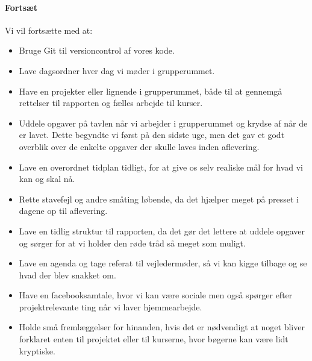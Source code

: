 \documentclass[oneside,a4paper,titlepage]{article}
\begin{document}
\paragraph{Fortsæt}
Vi vil fortsætte med at:
\begin{itemize}
  \item Bruge Git til versioncontrol af vores kode.
  \item Lave dagsordner hver dag vi møder i grupperummet.
  \item Have en projekter eller lignende i grupperummet, både til at gennemgå rettelser til rapporten og fælles arbejde til kurser. 
  \item Uddele opgaver på tavlen når vi arbejder i grupperummet og krydse af når de er lavet. Dette begyndte vi først på den sidste uge, men det gav et godt overblik over de enkelte opgaver der skulle laves inden aflevering.
  \item Lave en overordnet tidplan tidligt, for at give os selv realiske mål for hvad vi kan og skal nå.
  \item Rette stavefejl og andre småting løbende, da det hjælper meget på presset i dagene op til aflevering. 
  \item Lave en tidlig struktur til rapporten, da det gør det lettere at uddele opgaver og sørger for at vi holder den røde tråd så meget som muligt. 
  \item Lave en agenda og tage referat til vejledermøder, så vi kan kigge tilbage og se hvad der blev snakket om.
  \item Have en facebooksamtale, hvor vi kan være sociale men også spørger efter projektrelevante ting når vi laver hjemmearbejde.
  \item Holde små fremlæggelser for hinanden, hvis det er nødvendigt at noget bliver forklaret enten til projektet eller til kurserne, hvor bøgerne kan være lidt kryptiske. 
  
\end{itemize}



\end{document}
